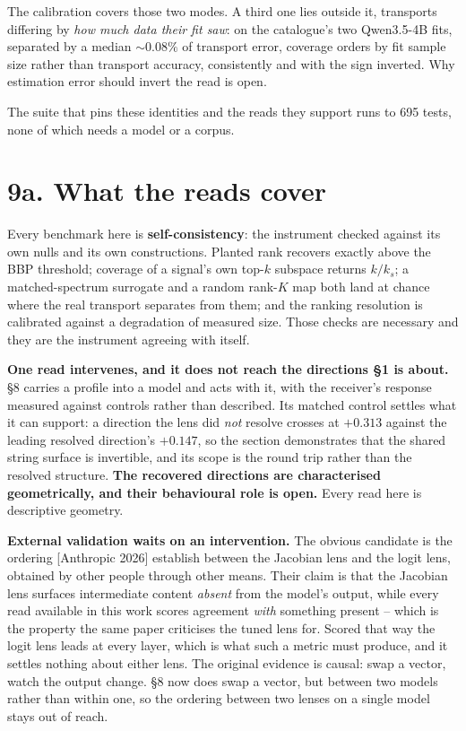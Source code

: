 \documentclass[10pt,letterpaper,twocolumn]{article}
\begin{document}
The calibration covers those two modes. A third one lies outside it, transports differing by \emph{how much data their fit saw}: on the catalogue's two Qwen3.5-4B fits, separated by a median \({\sim}0.08\%\) of transport error, coverage orders by fit sample size rather than transport accuracy, consistently and with the sign inverted. Why estimation error should invert the read is open.

The suite that pins these identities and the reads they support runs to 695 tests, none of which needs a model or a corpus.

\section{9a. What the reads cover}\label{9a-what-the-reads-cover}

Every benchmark here is \textbf{self-consistency}: the instrument checked against its own nulls and its own constructions. Planted rank recovers exactly above the BBP threshold; coverage of a signal's own top-\(k\) subspace returns \(k/k_s\); a matched-spectrum surrogate and a random rank-\(K\) map both land at chance where the real transport separates from them; and the ranking resolution is calibrated against a degradation of measured size. Those checks are necessary and they are the instrument agreeing with itself.

\textbf{One read intervenes, and it does not reach the directions §1 is about.} §8 carries a profile into
a model and acts with it, with the receiver's response measured against controls rather than
described. Its matched control settles what it can support: a direction the lens did \emph{not} resolve
crosses at \(+0.313\) against the leading resolved direction's \(+0.147\), so the section demonstrates
that the shared string surface is invertible, and its scope is the round trip rather than the
resolved structure.
\textbf{The recovered directions are characterised geometrically, and their behavioural role is open.}
Every read here is descriptive geometry.

\textbf{External validation waits on an intervention.} The obvious candidate is the ordering {[}Anthropic 2026{]} establish between the Jacobian lens and the logit lens, obtained by other people through other means. Their claim is that the Jacobian lens surfaces intermediate content \emph{absent} from the model's output, while every read available in this work scores agreement \emph{with} something present -- which is the property the same paper criticises the tuned lens for. Scored that way the logit lens leads at every layer, which is what such a metric must produce, and it settles nothing about either lens. The original evidence is causal: swap a vector, watch the output change. §8 now does swap a vector, but between two models rather than within one, so the ordering between two lenses on a single model stays out of reach.
\end{document}
